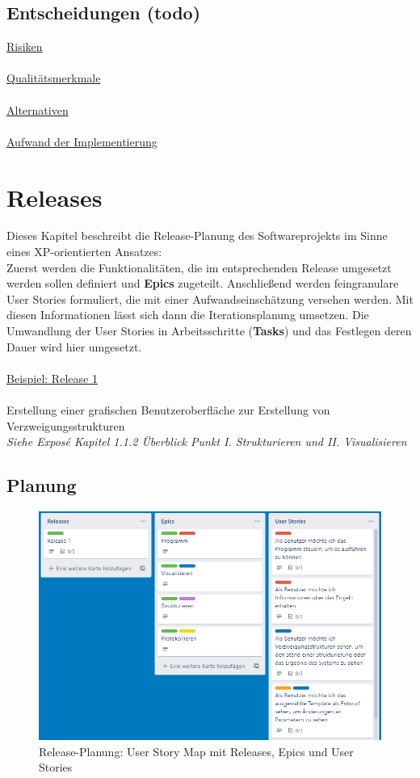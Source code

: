 \documentclass[11pt]{article}
\begin{document}
    \subsection{Entscheidungen (todo)}
        \underline{Risiken}\\~\\
        \underline{Qualitätsmerkmale}\\~\\
        \underline{Alternativen}\\~\\
        \underline{Aufwand der Implementierung}

    \newpage

    \section{Releases}
    Dieses Kapitel beschreibt die Release-Planung des Softwareprojekts im Sinne eines XP-orientierten Ansatzes:\\
    Zuerst werden die Funktionalitäten, die im entsprechenden Release umgesetzt werden sollen definiert und \textbf{Epics}
    zugeteilt.
    Anschließend werden feingranulare User Stories formuliert, die mit einer Aufwandseinschätzung versehen werden.
    Mit diesen Informationen lässt sich dann die Iterationsplanung umsetzen.
    Die Umwandlung der User Stories in Arbeitsschritte (\textbf{Tasks}) und das Festlegen deren Dauer wird hier
    umgesetzt.\\~\\
    \underline{Beispiel: Release 1}\\~\\
    Erstellung einer grafischen Benutzeroberfläche zur Erstellung von Verzweigungsstrukturen\\
    \textit{Siehe Exposé Kapitel 1.1.2 Überblick Punkt I. Strukturieren und II. Visualisieren}
    
    \subsection{Planung}
    \begin{figure}[H]
        \centering
        \includegraphics[width=12cm]{../images/User_Story_Map.PNG}
        \caption{Release-Planung: User Story Map mit Releases, Epics und User Stories}
    \end{figure}
\end{document}
